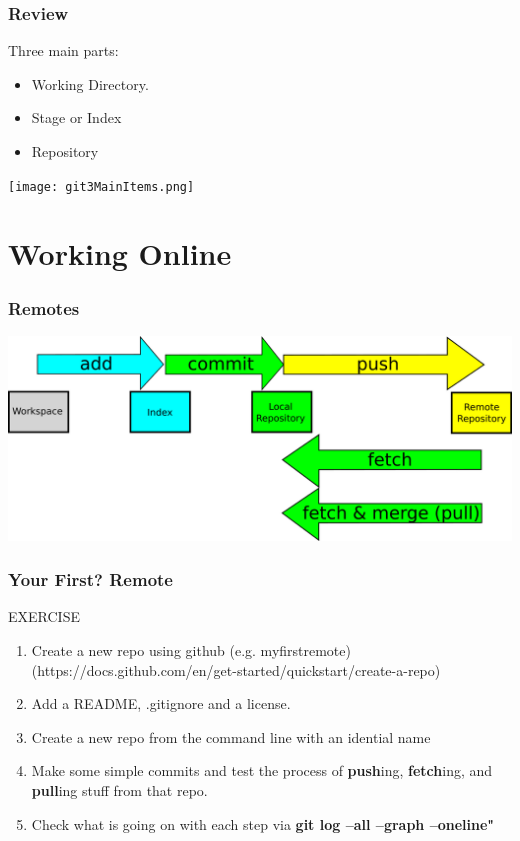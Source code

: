 \documentclass{beamer}
\begin{document}
\begin{frame}
	\frametitle{\textbf{Review}}
	Three main parts:
	\begin{itemize}
		\item Working Directory.
		\item Stage or Index
		\item Repository
	\end{itemize}
	\texttt{[image: git3MainItems.png]}
\end{frame}	

\section{Working Online}

\begin{frame}
	\frametitle{\textbf{Remotes}}
	\begin{center}
		\includegraphics[width=\textwidth]{remotes.png}
	\end{center}
\end{frame}	

\begin{frame}[fragile]
	\frametitle{Your First? Remote}
	\begin{block}{EXERCISE}
		\begin{enumerate}
			\item Create a new repo using github (e.g. myfirstremote) (https://docs.github.com/en/get-started/quickstart/create-a-repo)
			\item Add a README, .gitignore and a license.
			\item Create a new repo from the command line with an idential name
			\item Make some simple commits and test the process of \textbf{push}ing, \textbf{fetch}ing,  and \textbf{pull}ing stuff from that repo.
			\item Check what is going on with each step via \textbf{git log --all --graph --oneline"}
		\end{enumerate}
	\end{block}
\end{frame}
\end{document}
